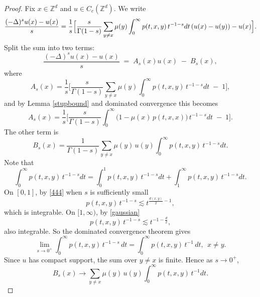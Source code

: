 \documentclass[reqno,12pt]{amsart}
\numberwithin{equation}{section}
\begin{document}
\begin{proof}
	Fix \(x\in\mathbb{Z}^d\) and \(u\in C_c(\mathbb{Z}^d)\).  We write
	\[
	\frac{(-\Delta)^s u(x)-u(x)}{s}
	=\frac{1}{s}\Bigl[\frac{s}{\Gamma(1-s)}
	\sum_{y\ne x}\mu(y)\int_0^\infty p(t,x,y)\,t^{-1-s}dt\,(u(x)-u(y)) - u(x)\Bigr].
	\]
	Split the sum into two terms:
	\[
	\frac{(-\Delta)^s u(x)-u(x)}{s}
	\;=\;
	A_s(x)u(x)\;-\;B_s(x),
	\]
	where
	\[
	A_s(x)
	=\frac{1}{s}\Biggl[
	\frac{s}{\Gamma(1-s)}
	\sum_{y\neq x}\mu(y)\int_{0}^{\infty}p(t,x,y)\,t^{-1-s}dt
	\;-\;1
	\Biggr],
	\]
	and by Lemma \ref{stupbound} and dominated convergence this becomes
	\[
	A_s(x)
	=\frac{1}{s}\Biggl[
	\frac{s}{\Gamma(1-s)}
	\int_{0}^{\infty}\bigl(1-\mu(x)\,p(t,x,x)\bigr)\,t^{-1-s}dt
	\;-\;1
	\Biggr].
	\]
	The other term is
	\[
	B_s(x)
	=\frac{1}{\Gamma(1-s)}
	\sum_{y\neq x}\mu(y)\,u(y)
	\int_{0}^{\infty}p(t,x,y)\,t^{-1-s}dt.
	\]
	Note that
	\[
	\int_0^\infty p(t,x,y)\,t^{-1-s}dt
	=\int_0^1 p(t,x,y)\,t^{-1-s}dt
	+\int_1^\infty p(t,x,y)\,t^{-1-s}dt.
	\]
	On \([0,1]\), by \eqref{444} when $s$ is sufficiently small
	\[
	p(t,x,y)\,t^{-1-s}\lesssim
	t^{\frac{d(x,y)}2-1},
	\]
	which is integrable.  On \([1,\infty)\), by \eqref{gaussian}
	\begin{equation}\label{dsjgj}
		p(t,x,y)\,t^{-1-s}\lesssim t^{-1-\frac{d}{2}},
	\end{equation}
	also integrable.  So the dominated convergence theorem gives
	\[
	\lim_{s\to0^+}\int_0^\infty p(t,x,y)\,t^{-1-s}\,dt
	=\int_0^\infty p(t,x,y)\,t^{-1}\,dt, \:\:x\ne y.
	\]
	Since \(u\) has compact support, the sum over \(y\neq x\) is finite. Hence as \(s\to0^+\),
	\begin{equation}\label{pp1}
		B_s(x)
		\rightarrow
		\sum_{y\neq x}\mu(y)\,u(y)
		\int_0^\infty p(t,x,y)\,t^{-1}dt.
	\end{equation}


\end{proof}
\end{document}
